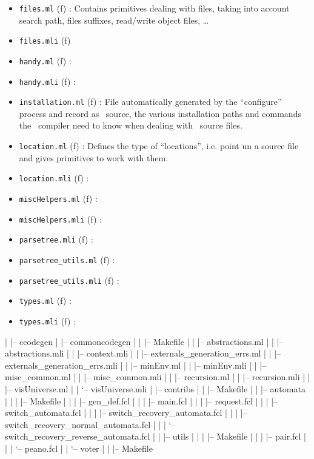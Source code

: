 \begin{itemize}
\begin{itemize}
\begin{itemize}
        \item {\tt files.ml} (f) : Contains primitives dealing with
          files, taking into account search path, files suffixes,
          read/write object files, \ldots
        \item {\tt files.mli} (f)
        \item {\tt handy.ml} (f) :
        \item {\tt handy.mli} (f) :
        \item {\tt installation.ml} (f) : File automatically generated
          by the ``configure'' process and record as \ocaml\ source, the
          various installation paths and commands the \focalizec\
          compiler need to know when dealing with \focalize\ source
          files.
        \item {\tt location.ml} (f) : Defines the type of
          ``locations'', i.e. point un a source file and gives
          primitives to work with them.
        \item {\tt location.mli} (f) :
        \item {\tt miscHelpers.ml} (f) :
        \item {\tt miscHelpers.mli} (f) :
        \item {\tt parsetree.mli} (f) :
        \item {\tt parsetree\_utils.ml} (f) :
        \item {\tt parsetree\_utils.mli} (f) :
        \item {\tt types.ml} (f) :
        \item {\tt types.mli} (f) :
\end{itemize}
|   |-- ccodegen
|   |-- commoncodegen
|   |   |-- Makefile
|   |   |-- abstractions.ml
|   |   |-- abstractions.mli
|   |   |-- context.mli
|   |   |-- externals\_generation\_errs.ml
|   |   |-- externals\_generation\_errs.mli
|   |   |-- minEnv.ml
|   |   |-- minEnv.mli
|   |   |-- misc\_common.ml
|   |   |-- misc\_common.mli
|   |   |-- recursion.ml
|   |   |-- recursion.mli
|   |   |-- visUniverse.ml
|   |   `-- visUniverse.mli
|   |-- contribs
|   |   |-- Makefile
|   |   |-- automata
|   |   |   |-- Makefile
|   |   |   |-- gen\_def.fcl
|   |   |   |-- main.fcl
|   |   |   |-- request.fcl
|   |   |   |-- switch\_automata.fcl
|   |   |   |-- switch\_recovery\_automata.fcl
|   |   |   |-- switch\_recovery\_normal\_automata.fcl
|   |   |   `-- switch\_recovery\_reverse\_automata.fcl
|   |   |-- utils
|   |   |   |-- Makefile
|   |   |   |-- pair.fcl
|   |   |   `-- peano.fcl
|   |   `-- voter
|   |       |-- Makefile

\end{itemize}
\end{itemize}
